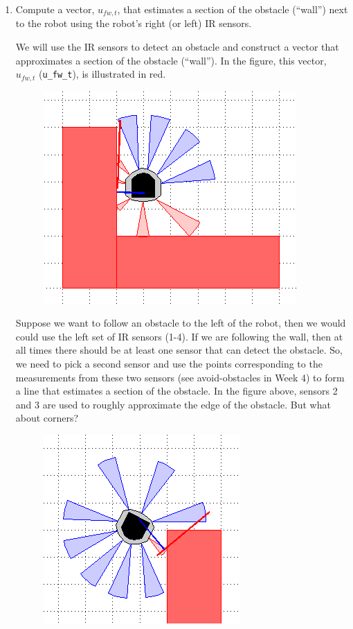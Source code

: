 \documentclass[10pt]{article}
\begin{document}
\begin{enumerate}
	\item Compute a vector, $u_{fw,t}$, that estimates a section of the obstacle (``wall'') next to the robot using the robot's right (or left) IR sensors.
	
	We will use the IR sensors to detect an obstacle and construct a vector that approximates a section of the obstacle (``wall''). In the figure, this vector, $u_{fw,t}$ (\texttt{u\_fw\_t}), is illustrated in red.
	
	\begin{figure}[h]
		\centering
		\includegraphics[scale=0.5]{week-6-part-1.png}
		\label{fig:week6part1}
	\end{figure}
	
	Suppose we want to follow an obstacle to the left of the robot, then we would could use the left set of IR sensors (1-4). If we are following the wall, then at all times there should be at least one sensor that can detect the obstacle. So, we need to pick a second sensor and use the points corresponding to the measurements from these two sensors (see avoid-obstacles in Week 4) to form a line that estimates a section of the obstacle. In the figure above, sensors 2 and 3 are used to roughly approximate the edge of the obstacle. But what about corners?
	
	\begin{figure}[h]
		\centering
		\includegraphics[scale=0.5]{week-6-part-1b.png}
		\label{fig:week6part1b}
	\end{figure}
	

\end{enumerate}
\end{document}
